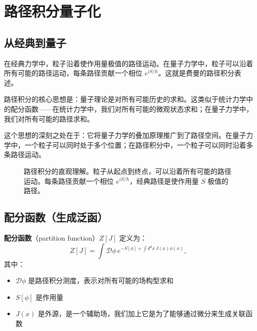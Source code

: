 \section{路径积分量子化}

\subsection{从经典到量子}

在经典力学中，粒子沿着使作用量极值的路径运动。在量子力学中，粒子可以沿着所有可能的路径运动，每条路径贡献一个相位 $e^{iS/\hbar}$。这就是费曼的路径积分表述。

\begin{note}[路径积分的物理直觉]
路径积分的核心思想是：量子理论是对所有可能历史的求和。这类似于统计力学中的配分函数——在统计力学中，我们对所有可能的微观状态求和；在量子力学中，我们对所有可能的路径求和。

这个思想的深刻之处在于：它将量子力学的叠加原理推广到了路径空间。在量子力学中，一个粒子可以同时处于多个位置；在路径积分中，一个粒子可以同时沿着多条路径运动。
\end{note}

\begin{figure}[htbp]
\centering
{}
\caption{路径积分的直观理解。粒子从起点到终点，可以沿着所有可能的路径运动。每条路径贡献一个相位 $e^{iS/\hbar}$，经典路径是使作用量 $S$ 极值的路径。}
\label{fig:path_integral}
\end{figure}

\subsection{配分函数（生成泛函）}

\begin{definition}[配分函数]
\textbf{配分函数}（partition function）$Z[J]$ 定义为：
\begin{equation}
    Z[J] = \int \mathcal{D}\phi \, e^{-S[\phi] + \int d^d x \, J(x) \phi(x)},
    \label{eq:QFT_Z}
\end{equation}
其中：
\begin{itemize}
    \item $\mathcal{D}\phi$ 是路径积分测度，表示对所有可能的场构型求和
    \item $S[\phi]$ 是作用量
    \item $J(x)$ 是外源，是一个辅助场，我们加上它是为了能够通过微分来生成关联函数
\end{itemize}
\end{definition}

